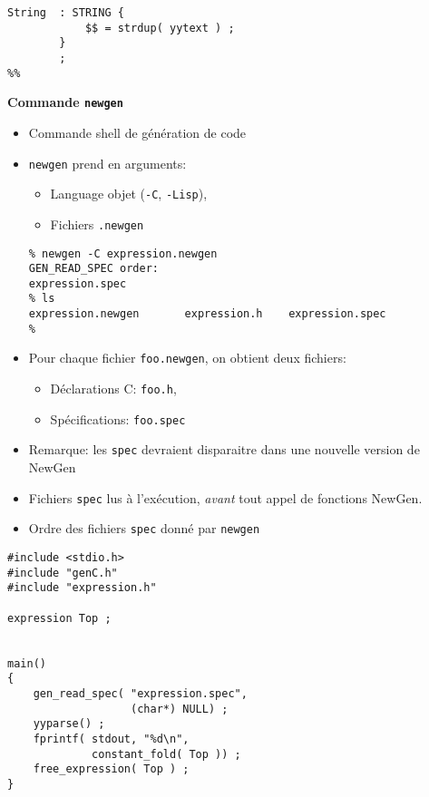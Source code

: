 \documentclass[11pt]{article}
\newcommand{\newgen}{NewGen}
\begin{document}
{\begin{verbatim}
String  : STRING {
            $$ = strdup( yytext ) ;
        }
        ;
%%
\end{verbatim}

\newpage

\begin{center}
{\huge\bf Commande {\tt newgen}}
\end{center}

\vskip 2cm

\begin{itemize}
\item Commande shell de génération de code
\item {\tt newgen} prend en arguments:
  \begin{itemize}
  \item Language objet ({\tt -C}, {\tt -Lisp}),
  \item Fichiers {\tt .newgen}
  \end{itemize}

\begin{verbatim}
% newgen -C expression.newgen
GEN_READ_SPEC order:
expression.spec
% ls
expression.newgen       expression.h    expression.spec
%
\end{verbatim}
\item Pour chaque fichier {\tt foo.newgen}, on obtient deux fichiers:
  \begin{itemize}
  \item Déclarations C: {\tt foo.h},
  \item Spécifications: {\tt foo.spec}
  \end{itemize}
\item Remarque: les {\tt spec} devraient disparaitre dans une
nouvelle version de \newgen
\item Fichiers {\tt spec} lus à l'exécution, {\em avant}
tout appel de fonctions \newgen.
\item Ordre des fichiers {\tt spec} donné par {\tt newgen}
\end{itemize}

\newpage

\vskip 2cm

\begin{verbatim}
#include <stdio.h>       
#include "genC.h"        
#include "expression.h"  

expression Top ; 


main() 
{ 
    gen_read_spec( "expression.spec", 
                   (char*) NULL) ; 
    yyparse() ; 
    fprintf( stdout, "%d\n", 
             constant_fold( Top )) ; 
    free_expression( Top ) ;
}
\end{verbatim}

}
\end{document}
